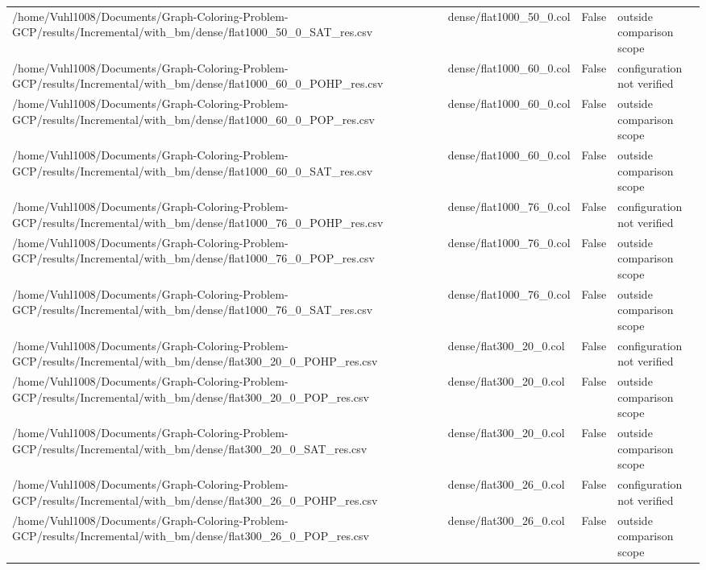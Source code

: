 \begin{table}[htbp]
\begin{tabular}{llll}
/home/Vuhl1008/Documents/Graph-Coloring-Problem-GCP/results/Incremental/with\_bm/dense/flat1000\_50\_0\_SAT\_res.csv & dense/flat1000\_50\_0.col & False & outside comparison scope \\
/home/Vuhl1008/Documents/Graph-Coloring-Problem-GCP/results/Incremental/with\_bm/dense/flat1000\_60\_0\_POHP\_res.csv & dense/flat1000\_60\_0.col & False & configuration not verified \\
/home/Vuhl1008/Documents/Graph-Coloring-Problem-GCP/results/Incremental/with\_bm/dense/flat1000\_60\_0\_POP\_res.csv & dense/flat1000\_60\_0.col & False & outside comparison scope \\
/home/Vuhl1008/Documents/Graph-Coloring-Problem-GCP/results/Incremental/with\_bm/dense/flat1000\_60\_0\_SAT\_res.csv & dense/flat1000\_60\_0.col & False & outside comparison scope \\
/home/Vuhl1008/Documents/Graph-Coloring-Problem-GCP/results/Incremental/with\_bm/dense/flat1000\_76\_0\_POHP\_res.csv & dense/flat1000\_76\_0.col & False & configuration not verified \\
/home/Vuhl1008/Documents/Graph-Coloring-Problem-GCP/results/Incremental/with\_bm/dense/flat1000\_76\_0\_POP\_res.csv & dense/flat1000\_76\_0.col & False & outside comparison scope \\
/home/Vuhl1008/Documents/Graph-Coloring-Problem-GCP/results/Incremental/with\_bm/dense/flat1000\_76\_0\_SAT\_res.csv & dense/flat1000\_76\_0.col & False & outside comparison scope \\
/home/Vuhl1008/Documents/Graph-Coloring-Problem-GCP/results/Incremental/with\_bm/dense/flat300\_20\_0\_POHP\_res.csv & dense/flat300\_20\_0.col & False & configuration not verified \\
/home/Vuhl1008/Documents/Graph-Coloring-Problem-GCP/results/Incremental/with\_bm/dense/flat300\_20\_0\_POP\_res.csv & dense/flat300\_20\_0.col & False & outside comparison scope \\
/home/Vuhl1008/Documents/Graph-Coloring-Problem-GCP/results/Incremental/with\_bm/dense/flat300\_20\_0\_SAT\_res.csv & dense/flat300\_20\_0.col & False & outside comparison scope \\
/home/Vuhl1008/Documents/Graph-Coloring-Problem-GCP/results/Incremental/with\_bm/dense/flat300\_26\_0\_POHP\_res.csv & dense/flat300\_26\_0.col & False & configuration not verified \\
/home/Vuhl1008/Documents/Graph-Coloring-Problem-GCP/results/Incremental/with\_bm/dense/flat300\_26\_0\_POP\_res.csv & dense/flat300\_26\_0.col & False & outside comparison scope \\

\end{tabular}
\end{table}
